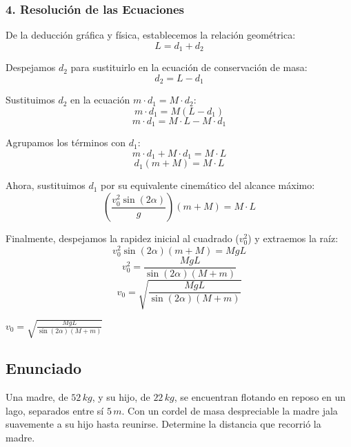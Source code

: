 \documentclass[12pt, a4paper]{article}
\begin{document}
\subsubsection*{4. Resolución de las Ecuaciones}
De la deducción gráfica y física, establecemos la relación geométrica:
$$L = d_1 + d_2$$

Despejamos $d_2$ para sustituirlo en la ecuación de conservación de masa:
$$d_2 = L - d_1$$

Sustituimos $d_2$ en la ecuación $m \cdot d_1 = M \cdot d_2$:
$$m \cdot d_1 = M(L - d_1)$$
$$m \cdot d_1 = M \cdot L - M \cdot d_1$$

Agrupamos los términos con $d_1$:
$$m \cdot d_1 + M \cdot d_1 = M \cdot L$$
$$d_1(m + M) = M \cdot L$$

Ahora, sustituimos $d_1$ por su equivalente cinemático del alcance máximo:
$$\left( \frac{v_0^2 \sin(2\alpha)}{g} \right) (m + M) = M \cdot L$$

Finalmente, despejamos la rapidez inicial al cuadrado ($v_0^2$) y extraemos la raíz:
$$v_0^2 \sin(2\alpha) (m + M) = M g L$$
$$v_0^2 = \frac{M g L}{\sin(2\alpha) (M + m)}$$
$$v_0 = \sqrt{\frac{M g L}{\sin(2\alpha) (M + m)}}$$

\begin{tcolorbox}[colback=green!5!white, colframe=green!50!black, title=Respuesta Final]
\centering \Large $v_0 = \sqrt{\frac{M g L}{\sin(2\alpha) (M + m)}}$
\end{tcolorbox}

\newpage

\subsection*{Enunciado}
Una madre, de $52 \, \si{kg}$, y su hijo, de $22 \, \si{kg}$, se encuentran flotando en reposo en un lago, separados entre sí $5 \, \si{m}$. Con un cordel de masa despreciable la madre jala suavemente a su hijo hasta reunirse. Determine la distancia que recorrió la madre.

\begin{center}
\end{center}
\end{document}
